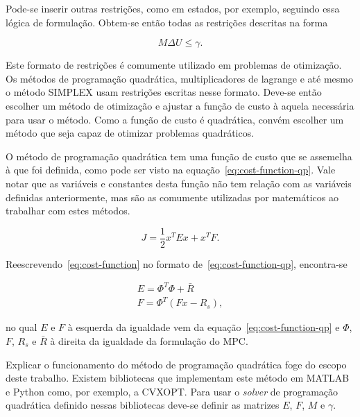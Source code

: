 Pode-se inserir outras restrições, como em estados, por exemplo, seguindo essa
lógica de formulação. Obtem-se então todas as restrições descritas na forma

\begin{equation}
	\label{eq:generic-restriction-formulation}
	M\Delta{}U \le \gamma.
\end{equation}

Este formato de restrições é comumente utilizado em problemas de otimização. Os
métodos de programação quadrática, multiplicadores de lagrange e até mesmo o
método SIMPLEX usam restrições escritas nesse formato. Deve-se então escolher um
método de otimização e ajustar a função de custo à aquela necessária para usar o
método. Como a função de custo é quadrática, convém escolher um método que seja
capaz de otimizar problemas quadráticos.

O método de programação quadrática tem uma função de custo que se assemelha à
que foi definida, como pode ser visto na equação~\eqref{eq:cost-function-qp}.
Vale notar que as variáveis e constantes desta função não tem relação com as
variáveis definidas anteriormente, mas são as comumente utilizadas por
matemáticos ao trabalhar com estes métodos.

\begin{equation}
	\label{eq:cost-function-qp}
	J = \frac{1}{2} x^T Ex + x^T F.
\end{equation}

Reescrevendo~\eqref{eq:cost-function} no formato de~\eqref{eq:cost-function-qp},
encontra-se

\begin{equation}
	\label{eq:cost-function-qp-constants}
	\begin{split}
		E = \Phi^T \Phi + \bar{R} \\
		F = \Phi^T (Fx - R_s),
	\end{split}
\end{equation}

no qual \( E \) e \( F \) à esquerda da igualdade vem da
equação~\eqref{eq:cost-function-qp} e \( \Phi \), \( F \), \( R_s \) e \(\bar{R}
\) à direita da igualdade da formulação do \ac{MPC}.

Explicar o funcionamento do método de programação quadrática foge do escopo
deste trabalho. Existem bibliotecas que implementam este método em MATLAB e
Python como, por exemplo, a CVXOPT\@. Para usar o \textit{solver} de programação
quadrática definido nessas bibliotecas deve-se definir as matrizes \( E \), \( F
\), \( M \) e \( \gamma \).

